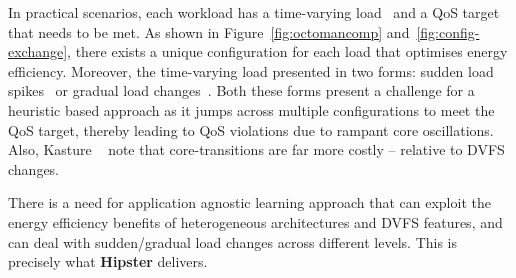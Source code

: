 In practical scenarios, each workload has a time-varying load~\citep{Li2014TalesTail} and
a QoS target that needs to be met. As shown in Figure~\ref{fig:octomancomp}
and~\ref{fig:config-exchange}, there exists a unique configuration for each load  that
optimises energy efficiency. Moreover, the time-varying load presented in two forms:
sudden load spikes~\citep{Dean2013TheScale} or gradual load
changes~\citep{Meisner2011PowerServices, Hoelzle2009TheMachinesb}. Both these forms
present a challenge for a heuristic based approach as it jumps across multiple
configurations to meet the QoS target, thereby leading to QoS violations due to rampant
core oscillations.  Also, Kasture \etal~\citep{Kasture2015Rubik} note that
core-transitions are far more costly -- relative to DVFS changes.

There is a need for application agnostic learning approach that can exploit the energy
efficiency benefits of heterogeneous architectures and DVFS features, and can deal with
sudden/gradual load changes across different levels. This is precisely what
\textbf{Hipster} delivers.

